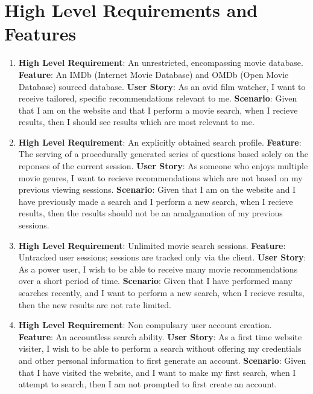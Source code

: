 \documentclass{article}
\begin{document}
\section{High Level Requirements and Features}
\begin{enumerate}
\item
\textbf{High Level Requirement}: An unrestricted, encompassing movie database.
\newline
\textbf{Feature}: An IMDb (Internet Movie Database) and OMDb (Open Movie 
Database) sourced database.
\newline
\textbf{User Story}: As an avid film watcher, I want to receive tailored, 
specific recommendations relevant to me.
\newline
\textbf{Scenario}:
Given that I am on the website and that I perform a movie search, when I recieve
results, then I should see results which are most relevant to me.
\newline

\item
\textbf{High Level Requirement}: An explicitly obtained search profile.
\newline
\textbf{Feature}:
The serving of a procedurally generated series of questions based solely on the
reponses of the current session.
\newline
\textbf{User Story}:
As someone who enjoys multiple movie genres, I want to recieve recommendations
which are not based on my previous viewing sessions.
\newline
\textbf{Scenario}:
Given that I am on the website and I have previously made a search and I 
perform a new search, when I recieve results, then the results should not be
an amalgamation of my previous sessions.
\newline

\item
\textbf{High Level Requirement}: Unlimited movie search sessions.
\newline
\textbf{Feature}:
Untracked user sessions; sessions are tracked only via the client.
\newline
\textbf{User Story}:
As a power user, I wish to be able to receive many movie recommendations over
a short period of time.
\newline
\textbf{Scenario}:
Given that I have performed many searches recently, and I want to perform a new
search, when I recieve results, then the new results are not rate limited.
\newline

\item
\textbf{High Level Requirement}: Non compulsary user account creation.
\newline
\textbf{Feature}:
An accountless search ability.
\newline
\textbf{User Story}:
As a first time website visiter, I wish to be able to perform a search without 
offering my credentials and other personal information to first generate an 
account.
\newline
\textbf{Scenario}:
Given that I have visited the website, and I want to make my first search, when
I attempt to search, then I am not prompted to first create an account.
\newline


\end{enumerate}
\end{document}
